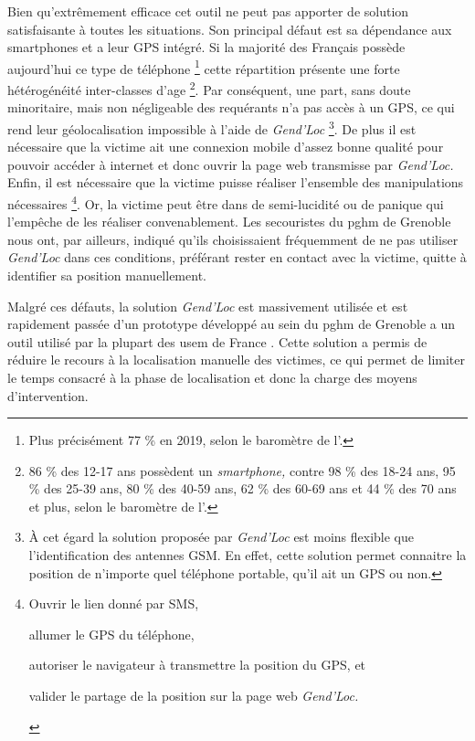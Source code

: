 Bien qu’extrêmement efficace cet outil ne peut pas apporter de
solution satisfaisante à toutes les situations. Son principal défaut
est sa dépendance aux smartphones et a leur GPS intégré. Si la
majorité des Français possède aujourd'hui ce type de téléphone
\footnote{Plus précisément 77 \% en 2019, selon le baromètre de
  l'\textcite{ARCEP2019}.} cette répartition présente une forte
hétérogénéité inter-classes d'age \footnote{86 \% des 12-17 ans
  possèdent un \emph{smartphone,} contre 98 \% des 18-24 ans, 95 \%
  des 25-39 ans, 80 \% des 40-59 ans, 62 \% des 60-69 ans et 44 \% des
  70 ans et plus, selon le baromètre de l'\textcite{ARCEP2019}.}. Par
conséquent, une part, sans doute minoritaire, mais non négligeable des
requérants n'a pas accès à un GPS, ce qui rend leur géolocalisation
impossible à l'aide de \emph{Gend'Loc} \footnote{À cet égard la
  solution proposée par \emph{Gend'Loc} est moins flexible que
  l'identification des antennes GSM. En effet, cette solution permet
  connaitre la position de n'importe quel téléphone portable, qu'il
  ait un GPS ou non.}. De plus il est nécessaire que la victime ait
une connexion mobile d'assez bonne qualité pour pouvoir accéder à
internet et donc ouvrir la page web transmisse par \emph{Gend'Loc.}
Enfin, il est nécessaire que la victime puisse réaliser l'ensemble des
manipulations nécessaires \footnote{%
  \begin{enumerate*}[label=(\arabic*)]
  \item Ouvrir le lien donné par SMS,
  \item allumer le GPS du téléphone,
  \item autoriser le navigateur à transmettre la position du GPS, et
  \item valider le partage de la position sur la page web \emph{Gend'Loc.} 
  \end{enumerate*}}.
%
Or, la victime peut être dans de semi-lucidité ou de panique qui
l’empêche de les réaliser convenablement. Les secouristes du \ac{pghm}
de Grenoble nous ont, par ailleurs, indiqué qu'ils choisissaient
fréquemment de ne pas utiliser \emph{Gend'Loc} dans ces conditions,
préférant rester en contact avec la victime, quitte à identifier sa
position manuellement.

Malgré ces défauts, la solution \emph{Gend'Loc} est massivement
utilisée et est rapidement passée d'un prototype développé au sein du
\ac{pghm} de Grenoble a un outil utilisé par la plupart des \ac{usem}
de France \autocite{Muscat2015}. Cette solution a permis de réduire le
recours à la localisation manuelle des victimes, ce qui permet de
limiter le temps consacré à la phase de localisation et donc la charge
des moyens d'intervention.

